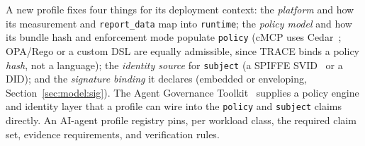A new profile fixes four things for its deployment context: the \emph{platform} and
how its measurement and \texttt{report\_data} map into \texttt{runtime}; the
\emph{policy model} and how its bundle hash and enforcement mode populate
\texttt{policy} (cMCP uses Cedar~\citep{cedar2023}; OPA/Rego or a custom DSL are
equally admissible, since TRACE binds a policy \emph{hash}, not a language); the
\emph{identity source} for \texttt{subject} (a SPIFFE SVID~\citep{spiffe2018} or a
DID); and the \emph{signature binding} it declares (embedded or enveloping,
Section~\ref{sec:model:sig}). The Agent Governance Toolkit~\citep{agt2026} supplies a
policy engine and identity layer that a profile can wire into the \texttt{policy} and
\texttt{subject} claims directly. An AI-agent profile registry pins, per workload
class, the required claim set, evidence requirements, and verification rules.
